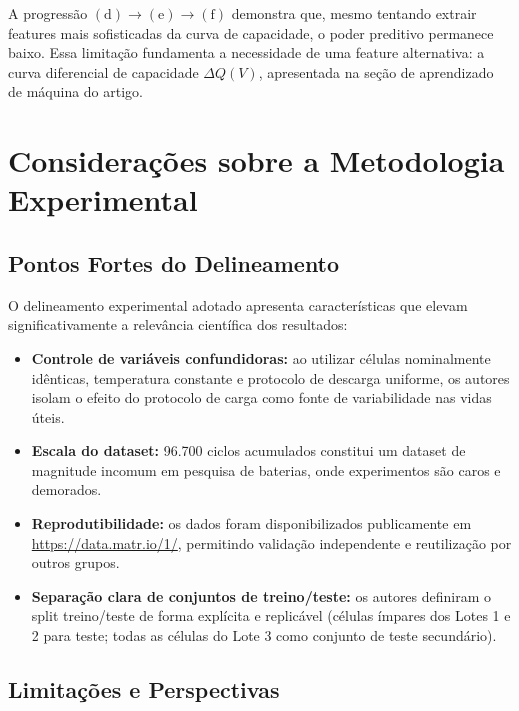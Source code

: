 \documentclass[12pt, a4paper]{article}
\begin{document}
A progressão $(\text{d}) \to (\text{e}) \to (\text{f})$ demonstra que,
mesmo tentando extrair features mais sofisticadas da curva de capacidade, o
poder preditivo permanece baixo. Essa limitação fundamenta a necessidade de
uma feature alternativa: a curva diferencial de capacidade $\Delta Q(V)$,
apresentada na seção de aprendizado de máquina do artigo.

\section{Considerações sobre a Metodologia Experimental}

\subsection{Pontos Fortes do Delineamento}

O delineamento experimental adotado apresenta características que elevam
significativamente a relevância científica dos resultados:

\begin{itemize}
  \item \textbf{Controle de variáveis confundidoras:} ao utilizar células
  nominalmente idênticas, temperatura constante e protocolo de descarga
  uniforme, os autores isolam o efeito do protocolo de carga como fonte
  de variabilidade nas vidas úteis.

  \item \textbf{Escala do dataset:} 96.700 ciclos acumulados constitui um
  dataset de magnitude incomum em pesquisa de baterias, onde experimentos
  são caros e demorados.

  \item \textbf{Reprodutibilidade:} os dados foram disponibilizados
  publicamente em \url{https://data.matr.io/1/}, permitindo validação
  independente e reutilização por outros grupos.

  \item \textbf{Separação clara de conjuntos de treino/teste:} os autores
  definiram o split treino/teste de forma explícita e replicável (células
  ímpares dos Lotes 1 e 2 para teste; todas as células do Lote 3 como
  conjunto de teste secundário).
\end{itemize}

\subsection{Limitações e Perspectivas}
\end{document}
